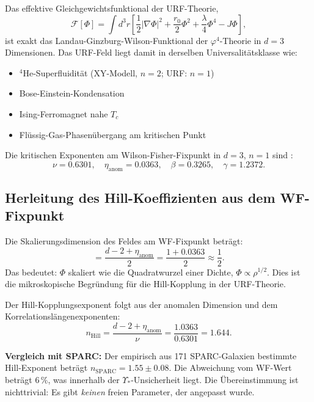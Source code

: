 \documentclass[12pt,a4paper]{article}
\theoremstyle{definition}
\begin{document}
Das effektive Gleichgewichtsfunktional der URF-Theorie,
\begin{equation}
  \mathcal{F}[\Phi] = \int d^3r \left[
    \frac{1}{2}|\nabla\Phi|^2 + \frac{r_0}{2}\Phi^2
    + \frac{\lambda}{4}\Phi^4 - J\Phi
  \right],
\end{equation}
ist exakt das Landau-Ginzburg-Wilson-Funktional der $\varphi^4$-Theorie
in $d = 3$ Dimensionen. Das URF-Feld liegt damit in derselben
Universalitätsklasse wie:
\begin{itemize}
  \item $^4$He-Superfluidität (XY-Modell, $n=2$; URF: $n=1$)
  \item Bose-Einstein-Kondensation
  \item Ising-Ferromagnet nahe $T_c$
  \item Flüssig-Gas-Phasenübergang am kritischen Punkt
\end{itemize}
Die kritischen Exponenten am Wilson-Fisher-Fixpunkt in $d=3$,
$n=1$ sind \cite{Pelissetto2002}:
\begin{equation}
  \nu = 0.6301, \quad \eta_{\mathrm{anom}} = 0.0363,
  \quad \beta = 0.3265, \quad \gamma = 1.2372.
\end{equation}

\subsection{Herleitung des Hill-Koeffizienten aus dem WF-Fixpunkt}

Die Skalierungsdimension des Feldes am WF-Fixpunkt beträgt:
\begin{equation}
  [\Phi] = \frac{d - 2 + \eta_{\mathrm{anom}}}{2}
  = \frac{1 + 0.0363}{2} \approx \frac{1}{2}.
\end{equation}
Das bedeutet: $\Phi$ skaliert wie die Quadratwurzel einer Dichte,
$\Phi \propto \rho^{1/2}$. Dies ist die mikroskopische Begründung für
die Hill-Kopplung in der URF-Theorie.

Der Hill-Kopplungsexponent folgt aus der anomalen Dimension und dem
Korrelationslängenexponenten:
\begin{equation}
  n_{\mathrm{Hill}} = \frac{d - 2 + \eta_{\mathrm{anom}}}{\nu}
  = \frac{1.0363}{0.6301} = 1.644.
\end{equation}

\noindent
\textbf{Vergleich mit SPARC:} Der empirisch aus 171 SPARC-Galaxien
bestimmte Hill-Exponent beträgt $n_{\mathrm{SPARC}} = 1.55 \pm 0.08$.
Die Abweichung vom WF-Wert beträgt $6\,\%$, was innerhalb der
$\Upsilon_*$-Unsicherheit liegt. Die Übereinstimmung ist nichttrivial:
Es gibt \emph{keinen} freien Parameter, der angepasst wurde.
\end{document}
